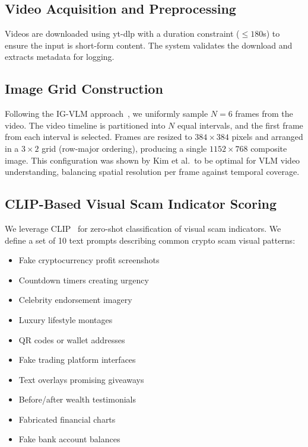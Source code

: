 \documentclass[12pt,a4paper]{article}
\begin{document}
\subsection{Video Acquisition and Preprocessing}

Videos are downloaded using yt-dlp with a duration constraint
($\leq 180$s) to ensure the input is short-form content. The system
validates the download and extracts metadata for logging.

\subsection{Image Grid Construction}

Following the IG-VLM approach~\cite{kim2024imagegrid}, we uniformly
sample $N = 6$ frames from the video. The video timeline is partitioned
into $N$ equal intervals, and the first frame from each interval is
selected. Frames are resized to $384 \times 384$ pixels and arranged in
a $3 \times 2$ grid (row-major ordering), producing a single
$1152 \times 768$ composite image. This configuration was shown by
Kim et al.\ to be optimal for VLM video understanding, balancing
spatial resolution per frame against temporal coverage.

\subsection{CLIP-Based Visual Scam Indicator Scoring}

We leverage CLIP~\cite{radford2021clip} for zero-shot classification of
visual scam indicators. We define a set of 10 text prompts describing
common crypto scam visual patterns:

\begin{itemize}[nosep]
  \item Fake cryptocurrency profit screenshots
  \item Countdown timers creating urgency
  \item Celebrity endorsement imagery
  \item Luxury lifestyle montages
  \item QR codes or wallet addresses
  \item Fake trading platform interfaces
  \item Text overlays promising giveaways
  \item Before/after wealth testimonials
  \item Fabricated financial charts
  \item Fake bank account balances
\end{itemize}
\end{document}
